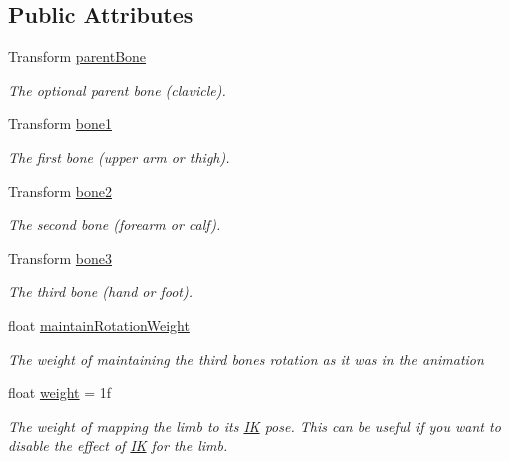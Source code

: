 \subsection*{Public Attributes}
\begin{DoxyCompactItemize}
\item 
Transform \mbox{\hyperlink{class_root_motion_1_1_final_i_k_1_1_i_k_mapping_limb_af480ef05ab503917f441d275ed8c8b13}{parent\+Bone}}
\begin{DoxyCompactList}\small\item\em The optional parent bone (clavicle). \end{DoxyCompactList}\item 
Transform \mbox{\hyperlink{class_root_motion_1_1_final_i_k_1_1_i_k_mapping_limb_aeb108a14f3398078896309020aaeedd1}{bone1}}
\begin{DoxyCompactList}\small\item\em The first bone (upper arm or thigh). \end{DoxyCompactList}\item 
Transform \mbox{\hyperlink{class_root_motion_1_1_final_i_k_1_1_i_k_mapping_limb_a2b296b91149791403d9faaef39c635dd}{bone2}}
\begin{DoxyCompactList}\small\item\em The second bone (forearm or calf). \end{DoxyCompactList}\item 
Transform \mbox{\hyperlink{class_root_motion_1_1_final_i_k_1_1_i_k_mapping_limb_aab10d22e5556a9db8903bf53d5385181}{bone3}}
\begin{DoxyCompactList}\small\item\em The third bone (hand or foot). \end{DoxyCompactList}\item 
float \mbox{\hyperlink{class_root_motion_1_1_final_i_k_1_1_i_k_mapping_limb_a449761c1a7bd9edfbfa4b814d46356fd}{maintain\+Rotation\+Weight}}
\begin{DoxyCompactList}\small\item\em The weight of maintaining the third bone\textquotesingle{}s rotation as it was in the animation \end{DoxyCompactList}\item 
float \mbox{\hyperlink{class_root_motion_1_1_final_i_k_1_1_i_k_mapping_limb_a47807e26762639a234b806ad72ea988c}{weight}} = 1f
\begin{DoxyCompactList}\small\item\em The weight of mapping the limb to it\textquotesingle{}s \mbox{\hyperlink{class_root_motion_1_1_final_i_k_1_1_i_k}{IK}} pose. This can be useful if you want to disable the effect of \mbox{\hyperlink{class_root_motion_1_1_final_i_k_1_1_i_k}{IK}} for the limb. \end{DoxyCompactList}\end{DoxyCompactItemize}
